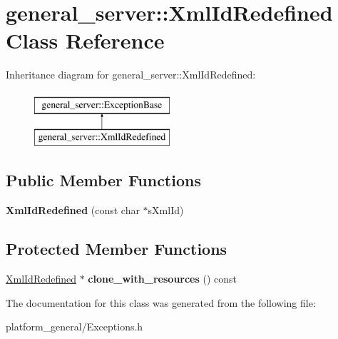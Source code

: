 \hypertarget{classgeneral__server_1_1XmlIdRedefined}{\section{general\-\_\-server\-:\-:\-Xml\-Id\-Redefined \-Class \-Reference}
\label{classgeneral__server_1_1XmlIdRedefined}
}
\-Inheritance diagram for general\-\_\-server\-:\-:\-Xml\-Id\-Redefined\-:\begin{figure}[H]
\begin{center}
\leavevmode
\includegraphics[height=2.000000cm]{classgeneral__server_1_1XmlIdRedefined}
\end{center}
\end{figure}
\subsection*{\-Public \-Member \-Functions}
\begin{DoxyCompactItemize}
\item 
\hypertarget{classgeneral__server_1_1XmlIdRedefined_a226544bdc5d41dedfffd56914afce5dd}{{\bfseries \-Xml\-Id\-Redefined} (const char $\ast$s\-Xml\-Id)}\label{classgeneral__server_1_1XmlIdRedefined_a226544bdc5d41dedfffd56914afce5dd}

\end{DoxyCompactItemize}
\subsection*{\-Protected \-Member \-Functions}
\begin{DoxyCompactItemize}
\item 
\hypertarget{classgeneral__server_1_1XmlIdRedefined_aaea8c738e6dcf5da542eaf767a9e2d4f}{\hyperlink{classgeneral__server_1_1XmlIdRedefined}{\-Xml\-Id\-Redefined} $\ast$ {\bfseries clone\-\_\-with\-\_\-resources} () const }\label{classgeneral__server_1_1XmlIdRedefined_aaea8c738e6dcf5da542eaf767a9e2d4f}

\end{DoxyCompactItemize}


\-The documentation for this class was generated from the following file\-:\begin{DoxyCompactItemize}
\item 
platform\-\_\-general/\-Exceptions.\-h\end{DoxyCompactItemize}
